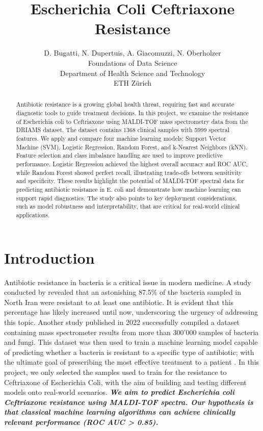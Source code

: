 \documentclass{article}
\title{Escherichia Coli Ceftriaxone Resistance}
\author{%
  D. Bugatti, N. Dupertuis, A. Giacomuzzi, N. Oberholzer\\
  Foundations of Data Science\\
  Department of Health Science and Technology\\
  ETH Zürich\\
}
\begin{document}
\maketitle

\begin{abstract}
Antibiotic resistance is a growing global health threat, requiring fast and accurate diagnostic tools to guide treatment decisions. In this project, we examine the resistance of Escherichia coli to Ceftriaxone using MALDI-TOF mass spectrometry data from the DRIAMS dataset. The dataset contains 1368 clinical samples with 5999 spectral features. We apply and compare four machine learning models: Support Vector Machine (SVM), Logistic Regression, Random Forest, and k-Nearest Neighbors (kNN). Feature selection and class imbalance handling are used to improve predictive performance. Logistic Regression achieved the highest overall accuracy and ROC AUC, while Random Forest showed perfect recall, illustrating trade-offs between sensitivity and specificity. These results highlight the potential of MALDI-TOF spectral data for predicting antibiotic resistance in E. coli and demonstrate how machine learning can support rapid diagnostics. The study also points to key deployment considerations, such as model robustness and interpretability, that are critical for real-world clinical applications.
\end{abstract}


\section{Introduction}

Antibiotic resistance in bacteria is a critical issue in modern medicine. A study conducted by \citet{IranBacteria} revealed that an astonishing 87.5\% of the bacteria sampled in North Iran were resistant to at least
one antibiotic. It is evident that this percentage has likely increased until now, underscoring the urgency
of addressing this topic. Another study published in 2022 successfully compiled a dataset containing mass
spectrometer results from more than 300’000 samples of bacteria and fungi. This dataset was then used to
train a machine learning model capable of predicting whether a bacteria is resistant to a specific type of
antibiotic; with the ultimate goal of prescribing the most effective treatment to a patient \citep{datasetExplaination}. In this
project, we only selected the samples used to train for the resistance to Ceftriaxone of Escherichia Coli,
with the aim of building and testing different models onto real-world scenarios.
\textbf{\textit{We aim to predict Escherichia coli Ceftriaxone resistance using MALDI-TOF spectra. Our hypothesis is that classical machine learning algorithms can achieve clinically relevant performance (ROC AUC > 0.85).}}
\end{document}

